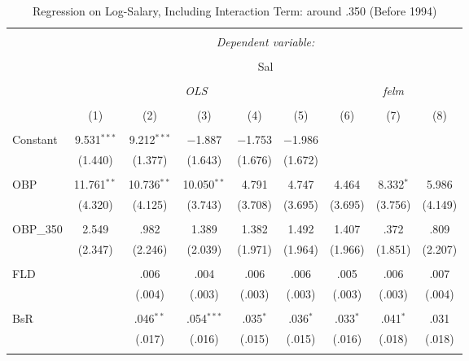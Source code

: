 
\begin{table}[H] \centering
  \caption{Regression on Log-Salary, Including Interaction Term: around .350 (Before 1994)} 
  \label{OBP350_B}
\tiny
\begin{tabular}{@{\extracolsep{5pt}}lcccccccc}
\\[-1.8ex]\hline
\hline \\[-1.8ex]
 & \multicolumn{8}{c}{\textit{Dependent variable:}} \\
\cline{2-9}
\\[-1.8ex] & \multicolumn{8}{c}{Sal} \\
\\[-1.8ex] & \multicolumn{5}{c}{\textit{OLS}} & \multicolumn{3}{c}{\textit{felm}} \\
\\[-1.8ex] & (1) & (2) & (3) & (4) & (5) & (6) & (7) & (8)\\
\hline \\[-1.8ex]
 Constant & 9.531$^{***}$ & 9.212$^{***}$ & $-$1.887 & $-$1.753 & $-$1.986 &  &  &  \\
  & (1.440) & (1.377) & (1.643) & (1.676) & (1.672) &  &  &  \\
  & & & & & & & & \\
 OBP & 11.761$^{**}$ & 10.736$^{**}$ & 10.050$^{**}$ & 4.791 & 4.747 & 4.464 & 8.332$^{*}$ & 5.986 \\
  & (4.320) & (4.125) & (3.743) & (3.708) & (3.695) & (3.695) & (3.756) & (4.149) \\
  & & & & & & & & \\
 OBP\_350 & 2.549 & .982 & 1.389 & 1.382 & 1.492 & 1.407 & .372 & .809 \\
  & (2.347) & (2.246) & (2.039) & (1.971) & (1.964) & (1.966) & (1.851) & (2.207) \\
  & & & & & & & & \\
 FLD &  & .006 & .004 & .006 & .006 & .005 & .006 & .007 \\
  &  & (.004) & (.003) & (.003) & (.003) & (.003) & (.003) & (.004) \\
  & & & & & & & & \\
 BsR &  & .046$^{**}$ & .054$^{***}$ & .035$^{*}$ & .036$^{*}$ & .033$^{*}$ & .041$^{*}$ & .031 \\
  &  & (.017) & (.016) & (.015) & (.015) & (.016) & (.018) & (.018) \\
  & & & & & & & & \\

\end{tabular}
\end{table}

